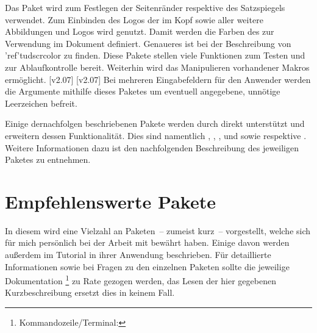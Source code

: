 \begin{DeclarePackages}
  Das Paket wird zum Festlegen der Seitenränder respektive des Satzspiegels 
  verwendet.
  Zum Einbinden des Logos der \TnUD im Kopf sowie aller weitere Abbildungen und 
  Logos wird  genutzt.
  Damit werden die Farben des \CDs zur Verwendung im Dokument definiert. 
  Genaueres ist bei der Beschreibung von \Package'ref'{tudscrcolor} zu finden. 
  Diese Pakete stellen viele Funktionen zum Testen und zur Ablaufkontrolle 
  bereit. Weiterhin wird das Manipulieren vorhandener Makros ermöglicht.
  [v2.07]
  [v2.07]
  Bei mehreren Eingabefeldern für den Anwender werden die Argumente mithilfe 
  dieses Paketes um eventuell angegebene, unnötige Leerzeichen befreit.
\end{DeclarePackages}

Einige dernachfolgen beschriebenen Pakete werden durch \TUDScript direkt 
unterstützt und erweitern dessen Funktionalität. Dies sind namentlich 
, , ,  
und  sowie  respektive . 
Weitere Informationen dazu ist den nachfolgenden Beschreibung des jeweiligen 
Paketes zu entnehmen.



\section{%
  Empfehlenswerte Pakete%
  \label{sec:packages:recommended}%
}
%
In diesem \autorefname wird eine Vielzahl an Paketen~-- zumeist kurz~-- 
vorgestellt, welche sich für mich persönlich bei der Arbeit mit  
bewährt haben. Einige davon werden außerdem im Tutorial  in 
ihrer Anwendung beschrieben. Für detaillierte Informationen sowie bei Fragen zu 
den einzelnen Paketen sollte die jeweilige Dokumentation%
\footnote{Kommandozeile/Terminal: }
zu Rate gezogen werden, das Lesen der hier gegebenen Kurzbeschreibung ersetzt 
dies in keinem Fall.



